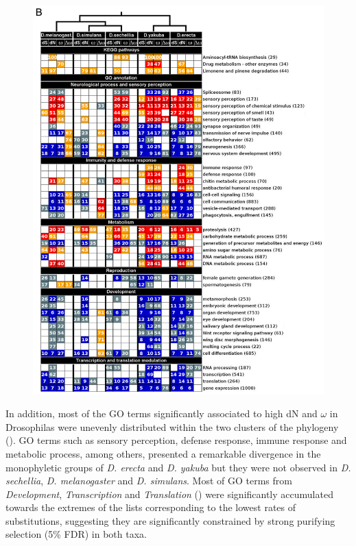 \begin{figure}
\centering 
\includegraphics[width=\textwidth]{tex_source/figures/gssa/table_flies_2.png}
\end{figure}

In addition, most of the GO terms significantly associated to high dN and $\omega$ in Drosophilas were unevenly distributed within the two clusters of the phylogeny (). GO terms such as sensory perception, defense response, immune response and metabolic process, among others, presented a remarkable divergence in the monophyletic groups of \textit{D. erecta} and \textit{D. yakuba} but they were not observed in \textit{D. sechellia}, \textit{D. melanogaster} and \textit{D. simulans}. Most of GO terms from \textit{Development}, \textit{Transcription} and \textit{Translation} () were significantly accumulated towards the extremes of the lists corresponding to the lowest rates of substitutions, suggesting they are significantly constrained by strong purifying selection (5\% FDR) in both taxa.

